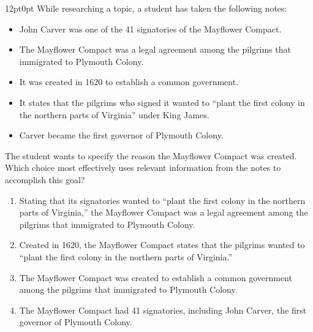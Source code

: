 \documentclass[11pt, twocolumn]{article}
\newcounter{questionnum}
\begin{document}
\vspace{6pt}\noindent
\begin{minipage}{\columnwidth}\raggedright
\noindent{}\par\vspace{8pt}
\begin{adjustwidth}{12pt}{0pt}
While researching a topic, a student has taken the following notes:

\begin{itemize}

\item John Carver was one of the 41 signatories of the Mayflower Compact.

\item The Mayflower Compact was a legal agreement among the pilgrims that immigrated to Plymouth Colony.

\item It was created in 1620 to establish a common government.

\item It states that the pilgrims who signed it wanted to ``plant the first colony in the northern parts of Virginia'' under King James.

\item Carver became the first governor of Plymouth Colony.

\end{itemize}
\vspace{6pt}

The student wants to specify the reason the Mayflower Compact was created. Which choice most effectively uses relevant information from the notes to accomplish this goal?
\begin{enumerate}[label=\Alph*),leftmargin=18pt,topsep=3pt,itemsep=2pt]
  \item Stating that its signatories wanted to ``plant the first colony in the northern parts of Virginia,'' the Mayflower Compact was a legal agreement among the pilgrims that immigrated to Plymouth Colony.
  \item Created in 1620, the Mayflower Compact states that the pilgrims wanted to ``plant the first colony in the northern parts of Virginia.''
  \item The Mayflower Compact was created to establish a common government among the pilgrims that immigrated to Plymouth Colony.
  \item The Mayflower Compact had 41 signatories, including John Carver, the first governor of Plymouth Colony.
\end{enumerate}
\end{adjustwidth}
\end{minipage}\par
\end{document}
